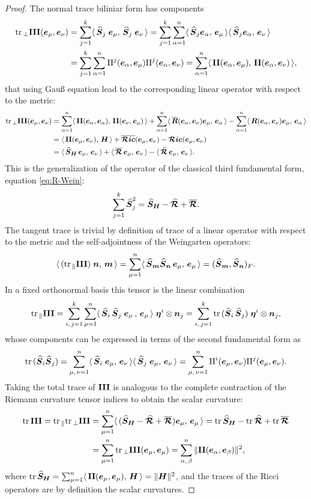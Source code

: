 \documentclass[letterpaper, reqno, 11pt]{amsart}
\theoremstyle{definition}
\theoremstyle{remark}
\numberwithin{equation}{section}
\begin{document}
\begin{proof}
The normal trace biliniar form has components
\begin{align}
\tr_\perp\III(\bE_\mu,\bE_\nu) & = \sum_{j=1}^k\metric{\oS_j\;\bE_\mu}{\oS_j\;\bE_\nu}= \sum_{j=1}^k\sum_{\al=1}^n\metric{\oS_j\bE_\al}{\bE_\mu}\metric{\oS_j\bE_\al}{\bE_\nu}\nonumber \\
& = \sum_{j=1}^k\sum_{\al=1}^n \mr{II}^j(\bE_\al,\bE_\mu)\mr{II}^j(\bE_\al,\bE_\nu) = \sum_{\al=1}^n\metric{\II(\bE_\al,\bE_\mu)}{\II(\bE_\al,\bE_\nu)}, \label{eq:trNcomp}
\end{align}
that using Gau{\ss} equation lead to the corresponding linear operator with respect to the metric:
\begin{align*}
\tr_\perp\III(\bE_\mu,\bE_\nu) & = \sum_{\al=1}^n\metric{\II(\bE_\al,\bE_\al)}{\II(\bE_\nu,\bE_\mu)} + \sum_{\al=1}^n \metric{\bar{\bR}(\bE_\al,\bE_\nu)\bE_\mu}{\bE_\al} - \sum_{\al=1}^n \metric{\bR(\bE_\al,\bE_\nu)\bE_\mu}{\bE_\al} \\
& = \metric{\II(\bE_\mu,\bE_\nu)}{\bH} + \bar{\bs{\mc{R}ic}}(\bE_\mu,\bE_\nu) - \Ric{\bE_\mu}{\bE_\nu} \\
& = \metric{\oS_{\bH}\,\bE_\mu}{\bE_\nu}+\metric{\bs{\bar{\mc{R}}}\,\bE_\mu}{\bE_\nu}-\metric{\bs{\hat{\mc{R}}}\,\bE_\mu}{\bE_\nu}.
\end{align*}
This is the generalization of the operator of the classical third fundamental form, equation \ref{eq:R-Wein}: $$\displaystyle \sum_{j=1}^k \oS_j^2 = \SH-\oR+\bar{\bs{\mc{R}}}.$$
The tangent trace is trivial by definition of trace of a linear operator with respect to the metric and the self-adjointness of the Weingarten operators:
$$
\metric{(\tr_\parallel\III)\;\bN}{\bM} = \sum_{\mu=1}^n\metric{\oS_{\bM}\oS_{\bN}\,\bE_\mu}{\bE_\mu} = (\oS_{\bM},\oS_{\bN})_F.
$$
In a fixed orthonormal basis this tensor is the linear combination
$$
\tr_\parallel\III = \sum_{i,\, j=1}^k \sum_{\mu=1}^n\langle\,\oS_i\,\oS_j\;\bE_\mu\, ,\,\bE_\mu\,\rangle\;\bs{\eta}^i\otimes\bN_j =  \sum_{i,\, j=1}^k \tr(\oS_i\,\oS_j) \;\bs{\eta}^i\otimes\bN_j,	
$$
whose components can be expressed in terms of the second fundamental form as
\begin{equation}\label{eq:trTcomp}
\tr(\oS_i\oS_j) =\sum^n_{\mu,\,\nu=1}\metric{\oS_i\;\bE_\mu}{\bE_\nu}\metric{\oS_j\;\bE_\mu}{\bE_\nu} =  \sum^n_{\mu,\,\nu=1} \mr{II}^i(\bE_\mu,\bE_\nu)\mr{II}^j(\bE_\mu,\bE_\nu).
\end{equation}
Taking the total trace of $\III$ is analogous to the complete contraction of the Riemann curvature tensor indices to obtain the scalar curvature:
\begin{align}
\tr\III = \tr_\parallel\tr_\perp\III & = \sum_{\mu=1}^n \metric{(\SH-\oR+\bar{\bs{\mc{R}}})\bE_\mu}{\bE_\mu} = \tr\SH - \tr\oR+\tr\bar{\bs{\mc{R}}}\nonumber \\
& = \sum_{\mu=1}^n\tr_\perp\III(\bE_\mu,\bE_\mu) = \sum_{\al,\,\bet}^n\|\II(\bE_\al,\bE_\bet)\|^2,\label{eq:trTotal}
\end{align}
where $\tr\SH =\sum_{\mu=1}^n\metric{\II(\bE_\mu,\bE_\mu)}{\bH} =\|\bH\|^2$, and the traces of the Ricci operators are by definition the scalar curvatures.
\end{proof}
\end{document}
